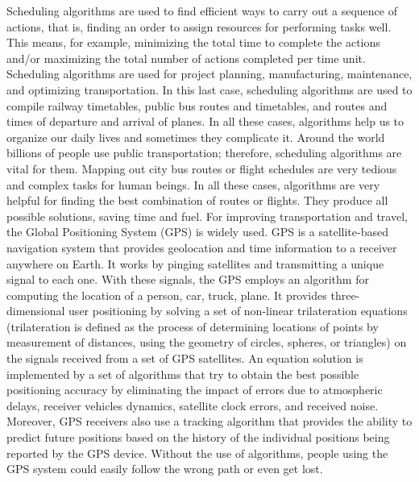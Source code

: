 Scheduling algorithms are used to find efficient ways to carry out a sequence of actions, that is, finding an order to assign resources for performing tasks well. This means, for example, minimizing the total time to complete the actions and/or maximizing the total number of actions completed per time unit. Scheduling algorithms are used for project planning, manufacturing, maintenance, and optimizing transportation. In this last case, scheduling algorithms are used to compile railway timetables, public bus routes and timetables, and routes and times of departure and arrival of planes. In all these cases, algorithms help us to organize our daily lives and sometimes they complicate it. Around the world billions of \hbox{people} use public transportation; therefore, scheduling algorithms are vital for them. Mapping out city bus routes or flight schedules are very tedious and complex tasks for human beings. In all these cases, algorithms are very helpful for finding the best combination of routes or flights. They produce all possible solutions, saving time and fuel. For improving transportation and travel, the Global Positioning System (GPS) is widely used. GPS is a satellite-based navigation system that provides geolocation and time information to a receiver anywhere on Earth. It works by pinging satellites and transmitting a unique signal to each one. With these signals, the GPS employs an algorithm for computing the location of a person, car, truck, plane. It provides three-dimensional user positioning by solving a set of non-linear trilateration equations (trilateration is defined as the process of determining locations of points by measurement of distances, using the geometry of circles, spheres, or triangles) on the signals received from a set of GPS satellites. An equation solution is implemented by a set of algorithms that try to obtain the best possible positioning accuracy by eliminating the impact of errors due to atmospheric delays, receiver vehicles dynamics, satellite clock errors, and received noise. Moreover, GPS receivers also use a tracking algorithm that provides the ability to predict future positions based on the history of the individual positions being reported by the GPS device. Without the use of algorithms, people using the GPS system could easily follow the wrong path or even get lost.

